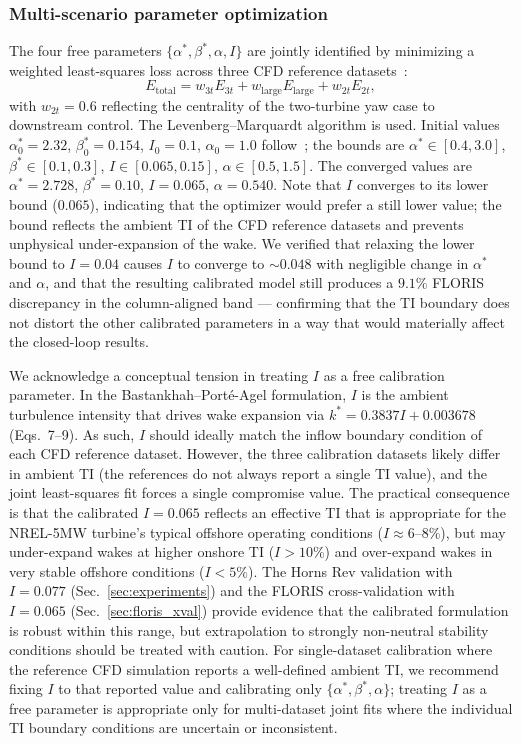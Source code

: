 \documentclass[final,5p,times]{elsarticle}
\begin{document}
\subsubsection{Multi-scenario parameter optimization}\label{sec:opt}
The four free parameters $\{\alpha^*,\beta^*,\alpha,I\}$ are jointly identified by minimizing a weighted least-squares loss across three CFD reference datasets~\citep{Duan2019,Li2016,Huang2020}:
\begin{equation}
E_\mathrm{total}=w_{3t}E_{3t}+w_\mathrm{large}E_\mathrm{large}+w_{2t}E_{2t},
\label{eq:loss}
\end{equation}
with $w_{2t}=0.6$ reflecting the centrality of the two-turbine yaw case to downstream control. The Levenberg--Marquardt algorithm is used. Initial values $\alpha^*_0=2.32$, $\beta^*_0=0.154$, $I_0=0.1$, $\alpha_0=1.0$ follow~\citep{Bastankhah2014}; the bounds are $\alpha^*\!\in[0.4,3.0]$, $\beta^*\!\in[0.1,0.3]$, $I\!\in[0.065,0.15]$, $\alpha\!\in[0.5,1.5]$. The converged values are $\alpha^*=2.728$, $\beta^*=0.10$, $I=0.065$, $\alpha=0.540$. Note that $I$ converges to its lower bound ($0.065$), indicating that the optimizer would prefer a still lower value; the bound reflects the ambient TI of the CFD reference datasets and prevents unphysical under-expansion of the wake. We verified that relaxing the lower bound to $I\!=\!0.04$ causes $I$ to converge to $\sim\!0.048$ with negligible change in $\alpha^*$ and $\alpha$, and that the resulting calibrated model still produces a $9.1\%$ FLORIS discrepancy in the column-aligned band --- confirming that the TI boundary does not distort the other calibrated parameters in a way that would materially affect the closed-loop results.

We acknowledge a conceptual tension in treating $I$ as a free calibration parameter. In the Bastankhah--Port\'e-Agel formulation, $I$ is the ambient turbulence intensity that drives wake expansion via $k^*{=}0.3837I{+}0.003678$ (Eqs.~7--9). As such, $I$ should ideally match the inflow boundary condition of each CFD reference dataset. However, the three calibration datasets likely differ in ambient TI (the references do not always report a single TI value), and the joint least-squares fit forces a single compromise value. The practical consequence is that the calibrated $I{=}0.065$ reflects an effective TI that is appropriate for the NREL-5MW turbine's typical offshore operating conditions ($I{\approx}6$--$8\%$), but may under-expand wakes at higher onshore TI ($I{>}10\%$) and over-expand wakes in very stable offshore conditions ($I{<}5\%$). The Horns Rev validation with $I{=}0.077$ (Sec.~\ref{sec:experiments}) and the FLORIS cross-validation with $I{=}0.065$ (Sec.~\ref{sec:floris_xval}) provide evidence that the calibrated formulation is robust within this range, but extrapolation to strongly non-neutral stability conditions should be treated with caution. For single-dataset calibration where the reference CFD simulation reports a well-defined ambient TI, we recommend fixing $I$ to that reported value and calibrating only $\{\alpha^*,\beta^*,\alpha\}$; treating $I$ as a free parameter is appropriate only for multi-dataset joint fits where the individual TI boundary conditions are uncertain or inconsistent.
\end{document}
